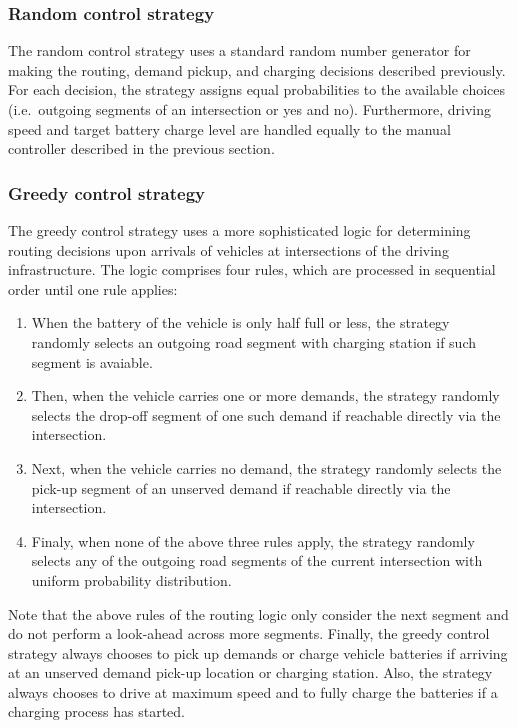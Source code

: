 \documentclass[10pt,twocolumn]{article}
\begin{document}
\subsubsection*{Random control strategy}
\label{sec:controller-random}

The random control strategy uses a standard random number generator for making the routing, demand pickup, and charging decisions described previously.
For each decision, the strategy assigns equal probabilities to the available choices (i.e.\ outgoing segments of an intersection or yes and no).
Furthermore, driving speed and target battery charge level are handled equally to the manual controller described in the previous section.

\subsubsection*{Greedy control strategy}
\label{sec:controller-greedy}

The greedy control strategy uses a more sophisticated logic for determining routing decisions upon arrivals of vehicles at intersections of the driving infrastructure.
The logic comprises four rules, which are processed in sequential order until one rule applies:
\begin{enumerate}
    \item When the battery of the vehicle is only half full or less, the strategy randomly selects an outgoing road segment with charging station if such segment is avaiable.
    \item Then, when the vehicle carries one or more demands, the strategy randomly selects the drop-off segment of one such demand if reachable directly via the intersection.
    \item Next, when the vehicle carries no demand, the strategy randomly selects the pick-up segment of an unserved demand if reachable directly via the intersection.
    \item Finaly, when none of the above three rules apply, the strategy randomly selects any of the outgoing road segments of the current intersection with uniform probability distribution.
\end{enumerate}
Note that the above rules of the routing logic only consider the next segment and do not perform a look-ahead across more segments.
Finally, the greedy control strategy always chooses to pick up demands or charge vehicle batteries if arriving at an unserved demand pick-up location or charging station.
Also, the strategy always chooses to drive at maximum speed and to fully charge the batteries if a charging process has started.
\end{document}
